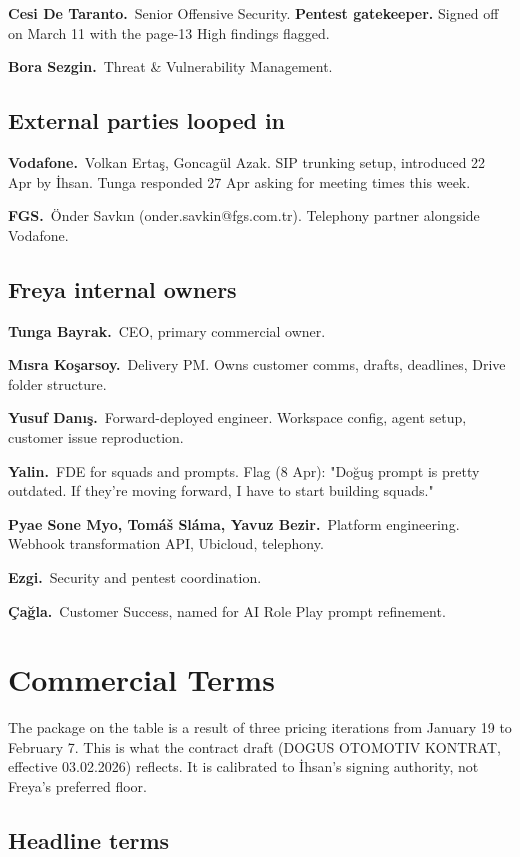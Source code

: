 \documentclass[10pt,a4paper]{article}
\newcommand{\datum}[2]{\textbf{\color{NavyDark}\small #1.}~\color{Ink}\small #2\par\smallskip}
\begin{document}
\datum{Cesi De Taranto}{Senior Offensive Security. \textbf{Pentest gatekeeper.} Signed off on March 11 with the page-13 High findings flagged.}
\datum{Bora Sezgin}{Threat \& Vulnerability Management.}

\subsection{External parties looped in}

\datum{Vodafone}{Volkan Ertaş, Goncagül Azak. SIP trunking setup, introduced 22 Apr by İhsan. Tunga responded 27 Apr asking for meeting times this week.}
\datum{FGS}{Önder Savkın (onder.savkin@fgs.com.tr). Telephony partner alongside Vodafone.}

\subsection{Freya internal owners}

\datum{Tunga Bayrak}{CEO, primary commercial owner.}
\datum{Mısra Koşarsoy}{Delivery PM. Owns customer comms, drafts, deadlines, Drive folder structure.}
\datum{Yusuf Danış}{Forward-deployed engineer. Workspace config, agent setup, customer issue reproduction.}
\datum{Yalin}{FDE for squads and prompts. Flag (8 Apr): "Doğuş prompt is pretty outdated. If they're moving forward, I have to start building squads."}
\datum{Pyae Sone Myo, Tomáš Sláma, Yavuz Bezir}{Platform engineering. Webhook transformation API, Ubicloud, telephony.}
\datum{Ezgi}{Security and pentest coordination.}
\datum{Çağla}{Customer Success, named for AI Role Play prompt refinement.}

\newpage

\section{Commercial Terms}

The package on the table is a result of three pricing iterations from January 19 to February 7. This is what the contract draft (DOGUS OTOMOTIV KONTRAT, effective 03.02.2026) reflects. It is calibrated to İhsan's signing authority, not Freya's preferred floor.

\subsection{Headline terms}
\end{document}
